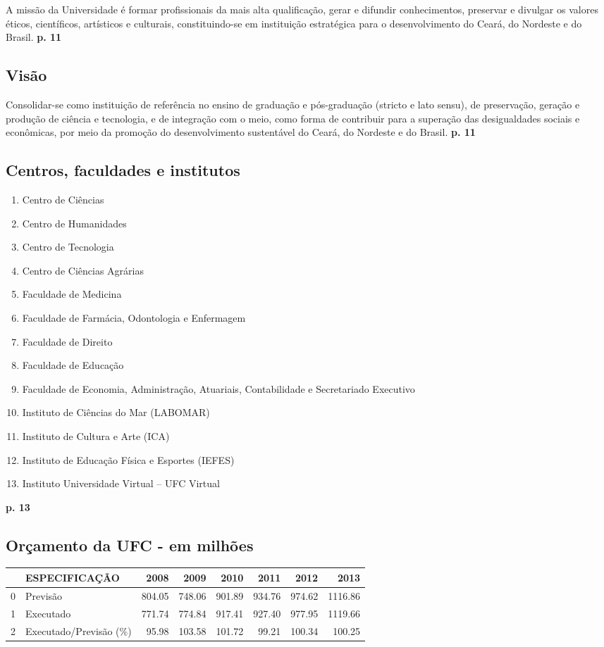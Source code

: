 \documentclass{report}
\begin{document}
A missão da Universidade é formar profissionais da mais alta qualificação, gerar e difundir conhecimentos, preservar e divulgar os valores éticos, científicos, artísticos e culturais, constituindo-se em instituição estratégica para o desenvolvimento do Ceará, do Nordeste e do Brasil.
\textbf{p. 11}

\subsection{Visão}

Consolidar-se como instituição de referência no ensino de graduação e pós-graduação (stricto e lato sensu), de preservação, geração e produção de ciência e tecnologia, e de integração com o meio, como forma de contribuir para a superação das desigualdades sociais e econômicas, por meio da promoção do desenvolvimento sustentável do Ceará, do Nordeste e do Brasil.
\textbf{p. 11}

\subsection{Centros, faculdades e institutos}

\begin{enumerate}
\item 
Centro de Ciências
\item 
Centro de Humanidades
\item 
Centro de Tecnologia
\item 
Centro de Ciências Agrárias
\item 
Faculdade de Medicina
\item 
Faculdade de Farmácia, Odontologia e Enfermagem
\item 
Faculdade de Direito
\item 
Faculdade de Educação
\item 
Faculdade de Economia, Administração, Atuariais, Contabilidade e Secretariado Executivo
\item 
Instituto de Ciências do Mar (LABOMAR)
\item 
Instituto de Cultura e Arte (ICA)
\item 
Instituto de Educação Física e Esportes (IEFES)
\item 
Instituto Universidade Virtual – UFC Virtual
\end{enumerate}
\textbf{p. 13}

\subsection{Orçamento da UFC - em milhões}
\begin{tabular}{llrrrrrr}
\toprule
{} &           ESPECIFICAÇÃO &    2008 &    2009 &    2010 &    2011 &    2012 &     2013 \\
\midrule
0 &                Previsão &  804.05 &  748.06 &  901.89 &  934.76 &  974.62 &  1116.86 \\
1 &               Executado &  771.74 &  774.84 &  917.41 &  927.40 &  977.95 &  1119.66 \\
2 &  Executado/Previsão (\%) &   95.98 &  103.58 &  101.72 &   99.21 &  100.34 &   100.25 \\
\bottomrule
\end{tabular}
\end{document}
